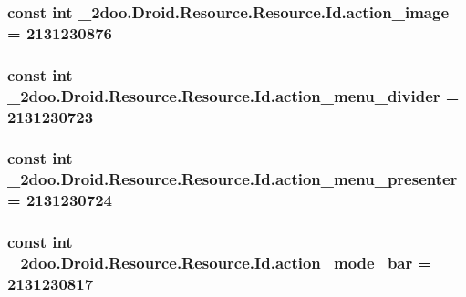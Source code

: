 \hypertarget{class__2doo_1_1_droid_1_1_resource_1_1_id_f79a855a04afaa3b82b8dc1ac94b2ca7}{
\subsubsection[{action\_\-image}]{\setlength{\rightskip}{0pt plus 5cm}const int \_\-2doo.Droid.Resource.Resource.Id.action\_\-image = 2131230876}}
\label{class__2doo_1_1_droid_1_1_resource_1_1_id_f79a855a04afaa3b82b8dc1ac94b2ca7}


\hypertarget{class__2doo_1_1_droid_1_1_resource_1_1_id_5552f14c3fb375cbb9b320eeccf045bf}{
\subsubsection[{action\_\-menu\_\-divider}]{\setlength{\rightskip}{0pt plus 5cm}const int \_\-2doo.Droid.Resource.Resource.Id.action\_\-menu\_\-divider = 2131230723}}
\label{class__2doo_1_1_droid_1_1_resource_1_1_id_5552f14c3fb375cbb9b320eeccf045bf}


\hypertarget{class__2doo_1_1_droid_1_1_resource_1_1_id_44d17380d253103b00e28d33c9693adf}{
\subsubsection[{action\_\-menu\_\-presenter}]{\setlength{\rightskip}{0pt plus 5cm}const int \_\-2doo.Droid.Resource.Resource.Id.action\_\-menu\_\-presenter = 2131230724}}
\label{class__2doo_1_1_droid_1_1_resource_1_1_id_44d17380d253103b00e28d33c9693adf}


\hypertarget{class__2doo_1_1_droid_1_1_resource_1_1_id_41ef793fd7f1cd11de880520e5fa9d52}{
\subsubsection[{action\_\-mode\_\-bar}]{\setlength{\rightskip}{0pt plus 5cm}const int \_\-2doo.Droid.Resource.Resource.Id.action\_\-mode\_\-bar = 2131230817}}
\label{class__2doo_1_1_droid_1_1_resource_1_1_id_41ef793fd7f1cd11de880520e5fa9d52}


